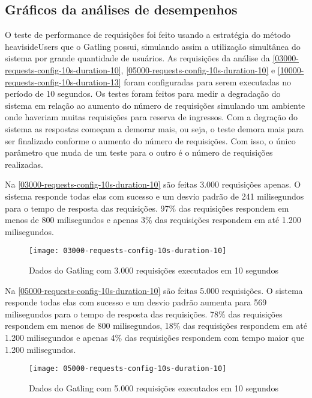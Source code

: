 \subsection{Gráficos da análises de desempenhos}

O teste de performance de requisições foi feito usando a
estratégia do método heavisideUsers \cite{gatling-simulation-setup}
que o Gatling possui, simulando assim a utilização simultânea do sistema por
grande quantidade de usuários.
As requisições da análise da
\autoref{03000-requests-config-10s-duration-10},
\autoref{05000-requests-config-10s-duration-10}
e \autoref{10000-requests-config-10s-duration-13}
foram configuradas para serem executadas no período de 10 segundos.
Os testes foram feitos para medir a degradação do sistema em relação ao aumento do
número de requisições simulando um ambiente onde haveriam muitas requisições para
reserva de ingressos.
Com a degração do sistema as respostas começam a demorar mais, ou seja,
o teste demora mais para ser finalizado conforme o aumento do número de requisições.
Com isso, o único parâmetro que muda de um teste para o outro
é o número de requisições realizadas.

Na \autoref{03000-requests-config-10s-duration-10} são feitas 3.000 requisições apenas.
O sistema responde todas elas com sucesso e um desvio padrão de 241 milisegundos
para o tempo de resposta das requisições.
97\% das requisições respondem em menos de 800 milisegundos e apenas 3\% das requisições
respondem em até 1.200 milisegundos.

\begin{figure}[h]
  \texttt{[image: 03000-requests-config-10s-duration-10]}
  \caption{Dados do Gatling com 3.000 requisições executados em 10 segundos}
  \label{03000-requests-config-10s-duration-10}
\end{figure}

Na \autoref{05000-requests-config-10s-duration-10} são feitas 5.000 requisições.
O sistema responde todas elas com sucesso e um desvio padrão aumenta para 569 milisegundos
para o tempo de resposta das requisições.
78\% das requisições respondem em menos de 800 milisegundos, 18\% das requisições
respondem em até 1.200 milisegundos e apenas 4\% das requisições
respondem com tempo maior que 1.200 milisegundos.

\begin{figure}[h]
  \texttt{[image: 05000-requests-config-10s-duration-10]}
  \caption{Dados do Gatling com 5.000 requisições executados em 10 segundos}
  \label{05000-requests-config-10s-duration-10}
\end{figure}

